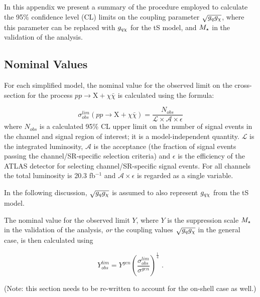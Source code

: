 In this appendix we present a summary of the procedure employed to calculate the 95\% confidence level (CL) limits on the coupling parameter $\sqrt{g_q g_{\chi}}$, where this parameter can be replaced with $g_{q \chi}$ for the tS model, and $M_{\star}$ in the validation of the \monojet analysis.

\subsection{Nominal Values}
For each simplified model, the nominal value for the observed limit on the cross-section for the process $pp \rightarrow \mathrm{X} + \chi\bar{\chi}$ is calculated using the formula:

\begin{equation}
\label{sigma_nom}
\sigma_{obs}^{lim}(pp \rightarrow \mathrm{X} + \chi\bar{\chi}) = \frac{N_{obs}}{\mathcal{L}\times\mathcal{A}\times\epsilon}
\end{equation}
where $N_{obs}$ is a calculated 95\% CL upper limit on the number of signal events in the channel and signal region of interest; it is a model-independent quantity. $\mathcal{L}$ is the integrated luminosity, $\mathcal{A}$ is the acceptance (the fraction of signal events passing the channel/SR-specific selection criteria) and $\epsilon$ is the efficiency of the ATLAS detector for selecting channel/SR-specific signal events. For all channels the total luminosity is 20.3 fb$^{-1}$ and $\mathcal{A}\times\epsilon$ is regarded as a single variable.

In the following discussion, $\sqrt{g_q g_{\chi}}$ is assumed to also represent $g_{q \chi}$ from the tS model.

The nominal value for the observed limit $Y$, where $Y$ is the suppression scale $M_{\star}$ in the validation of the \monojet analysis, \emph{or} the coupling values $\sqrt{g_q g_{\chi}}$ in the general case, is then calculated using


\begin{equation}
\label{nom_lim}
Y_{obs}^{lim} = Y^{gen} \left ( \frac{\sigma_{obs}^{lim}}{\sigma^{gen}} \right)^{\frac{1}{4}} \, \, .
\end{equation}

(Note: this section needs to be re-written to account for the on-shell case as well.)

